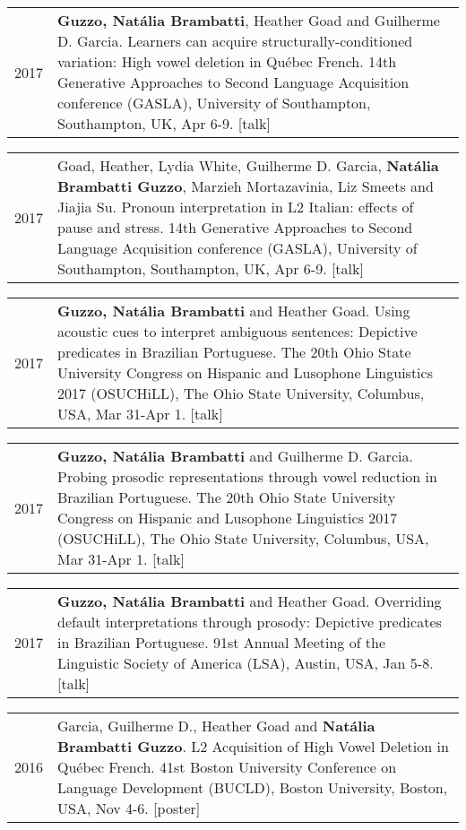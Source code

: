 \documentclass[letterpaper,10pt]{article}
\begin{document}
\begin{tabular}{p{1cm}p{16cm}}
2017 & \textbf{Guzzo, Nat\'alia Brambatti}, Heather Goad and Guilherme D. Garcia. Learners can acquire structurally-conditioned variation: High vowel deletion in Qu\'ebec French. 14th Generative Approaches to Second Language Acquisition conference (GASLA), University of Southampton, Southampton, UK, Apr 6-9. [talk]
\end{tabular}


\begin{tabular}{p{1cm}p{16cm}}
2017 & Goad, Heather, Lydia White, Guilherme D. Garcia, \textbf{Nat\'alia Brambatti Guzzo}, Marzieh Mortazavinia, Liz Smeets and Jiajia Su. Pronoun interpretation in L2 Italian: effects of pause and stress. 14th Generative Approaches to Second Language Acquisition conference (GASLA), University of Southampton, Southampton, UK, Apr 6-9. [talk]
\end{tabular}


\begin{tabular}{p{1cm}p{16cm}}
2017 & \textbf{Guzzo, Nat\'alia Brambatti} and Heather Goad. Using acoustic cues to interpret ambiguous sentences: Depictive predicates in Brazilian Portuguese. The 20th Ohio State University Congress on Hispanic and Lusophone Linguistics 2017 (OSUCHiLL), The Ohio State University, Columbus, USA, Mar 31-Apr 1. [talk]
\end{tabular}


\begin{tabular}{p{1cm}p{16cm}}
2017 & \textbf{Guzzo, Nat\'alia Brambatti} and Guilherme D. Garcia. Probing prosodic representations through vowel reduction in Brazilian Portuguese. The 20th Ohio State University Congress on Hispanic and Lusophone Linguistics 2017 (OSUCHiLL), The Ohio State University, Columbus, USA, Mar 31-Apr 1. [talk]
\end{tabular}


\begin{tabular}{p{1cm}p{16cm}}
2017 & \textbf{Guzzo, Nat\'alia Brambatti} and Heather Goad. Overriding default interpretations through prosody: Depictive predicates in Brazilian Portuguese. 91st Annual Meeting of the Linguistic Society of America (LSA), Austin, USA, Jan 5-8. [talk]
\end{tabular}


\begin{tabular}{p{1cm}p{16cm}}
2016 & Garcia, Guilherme D., Heather Goad and \textbf{Nat\'alia Brambatti Guzzo}. L2 Acquisition of High Vowel Deletion in Qu\'ebec French. 41st Boston University Conference on Language Development (BUCLD), Boston University, Boston, USA, Nov 4-6. [poster]%
\end{tabular}
\end{document}

